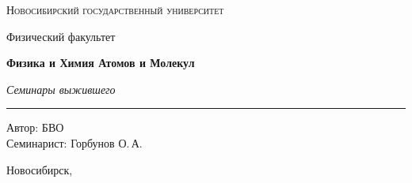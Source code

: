 \documentclass[12pt,a4paper]{report}
\begin{document}
\hypersetup{pageanchor=false}
\begin{titlepage}
    \thispagestyle{empty}

    \begin{center}
        \vspace*{1.5cm}

        {\Large\scshape Новосибирский государственный университет\par}
        \vspace{0.25cm}
        {\large Физический факультет\par}

        \vfill

        {\Huge\bfseries Физика и Химия Атомов и Молекул\par}

        \vspace{0.45cm}

        {\Large\itshape Семинары выжившего\par}

        \vspace{0.8cm}

        \rule{0.72\linewidth}{0 pt}





        \vfill

        \begin{flushright}
            \large
            Автор: БВО\\[0.25cm]
            Семинарист: Горбунов О.\,А.
        \end{flushright}

        \vspace{1.2cm}

        {\large Новосибирск, \the\year}

    \end{center}
\end{titlepage}
\hypersetup{pageanchor=true}

\tableofcontents
\newpage



\clearpage

\clearpage

\clearpage

\clearpage

\clearpage

\clearpage
\end{document}
